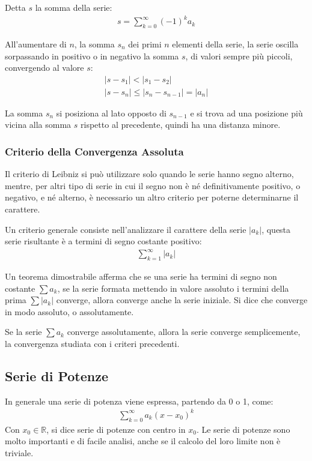 \documentclass{article}
\numberwithin{equation}{subsection}
\begin{document}
Detta $s$ la somma della serie:
\begin{gather*}
    s=\displaystyle\sum_{k=0}^\infty(-1)^ka_k
\end{gather*}

All'aumentare di $n$, la somma $s_n$ dei primi $n$ elementi della serie, la serie oscilla sorpassando in positivo o in negativo la somma $s$, di valori sempre più piccoli, convergendo al valore $s$:
\begin{gather*}
    |s-s_1| < |s_1-s_2|\\
    |s-s_n| \leq |s_n-s_{n-1}|=|a_n|
\end{gather*}

La somma $s_n$ si posiziona al lato opposto di $s_{n-1}$ e si trova ad una posizione più vicina alla somma $s$ rispetto al precedente, quindi ha una distanza minore. 

\subsubsection{Criterio della Convergenza Assoluta}

Il criterio di Leibniz si può utilizzare solo quando le serie hanno segno alterno, mentre, per altri tipo di serie in cui il segno non è né definitivamente positivo, o negativo, e né alterno, è necessario un altro criterio per poterne determinarne il carattere. 

Un criterio generale consiste nell'analizzare il carattere della serie $|a_k|$, questa serie risultante è a termini di segno costante positivo:
\begin{gather*}
    \displaystyle\sum_{k=1}^\infty|a_k|
\end{gather*}

Un teorema dimostrabile afferma che se una serie ha termini di segno non costante $\sum a_k$, se la serie formata mettendo in valore assoluto i termini della prima $\sum|a_k|$ converge, allora converge anche la serie iniziale. Si dice che converge in modo assoluto, o assolutamente. 

Se la serie $\sum a_k$ converge assolutamente, allora la serie converge semplicemente, la convergenza studiata con i criteri precedenti. 

\subsection{Serie di Potenze}

In generale una serie di potenza viene espressa, partendo da 0 o 1, come:
\begin{gather}
    \displaystyle\sum_{k=0}^\infty a_k(x-x_0)^k
\end{gather}
Con $x_0\in\mathbb{R}$, si dice serie di potenze con centro in $x_0$. Le serie di potenze sono molto importanti e di facile analisi, anche se il calcolo del loro limite non è triviale. 
\end{document}
